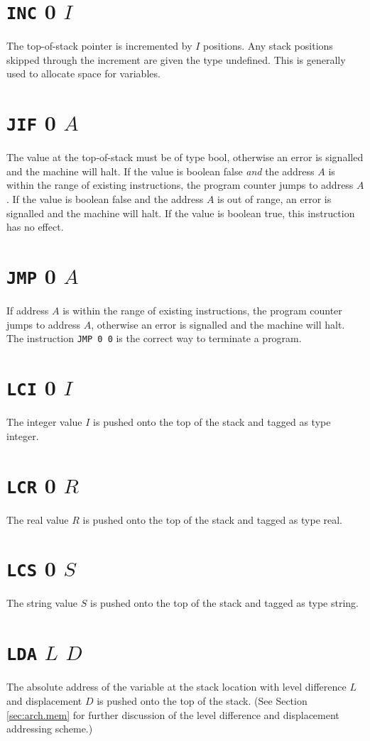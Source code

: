 \documentclass[a4paper,10pt]{report}
\begin{document}
\section{\texttt{INC} 0 $I$}
\label{sec:instr:INC}
The top-of-stack pointer is incremented by $I$ positions.  Any stack
positions skipped through the increment are given the type undefined.
This is generally used to allocate space for variables.

\section{\texttt{JIF} 0 $A$}
The value at the top-of-stack must be of type bool, otherwise an error
is signalled and the machine will halt.  If the value is boolean false
\emph{and} the address $A$ is within the range of existing
instructions, the program counter jumps to address $A$.  If the value
is boolean false and the address $A$ is out of range, an error is
signalled and the machine will halt.  If the value is boolean true,
this instruction has no effect.

\section{\texttt{JMP} 0 $A$}
If address $A$ is within the range of existing instructions, the
program counter jumps to address $A$, otherwise an error is signalled
and the machine will halt.  The instruction \texttt{JMP 0 0} is the
correct way to terminate a program.

\section{\texttt{LCI} 0 $I$}
The integer value $I$ is pushed onto the top of the stack and tagged
as type integer.

\section{\texttt{LCR} 0 $R$}
The real value $R$ is pushed onto the top of the stack and tagged as
type real.

\section{\texttt{LCS} 0 $S$}
The string value $S$ is pushed onto the top of the stack and tagged
as type string.

\section{\texttt{LDA} $L$ $D$}
The absolute address of the variable at the stack location with level
difference $L$ and displacement $D$ is pushed onto the top of the
stack.  (See Section \ref{sec:arch.mem} for further discussion of the
level difference and displacement addressing scheme.)
\end{document}
